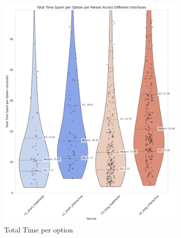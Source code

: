\begin{figure}[ht]
    \centering
    \begin{subfigure}[b]{0.32\textwidth}
        \centering
        \includegraphics[width=\textwidth]{content/image/results/total_time_per_option.pdf}
        \caption{Total Time per option}
        \label{fig:total_time}
    \end{subfigure}
    \hfill
    \begin{subfigure}[b]{0.32\textwidth}
        \centering

\end{subfigure}
\end{figure}
